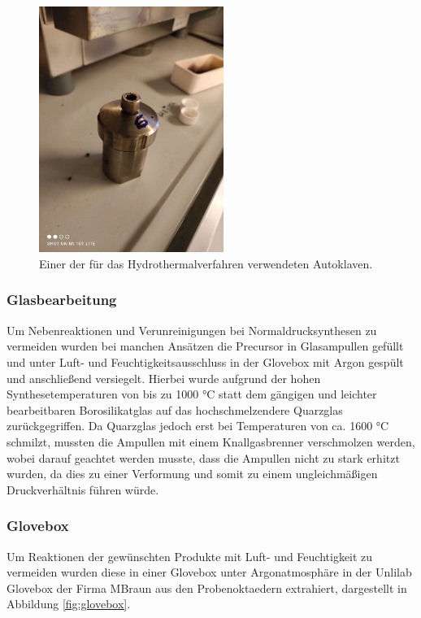 \documentclass[12pt]{article}
\begin{document}
\begin{figure}[H]
    \centering
    \includegraphics[height=8cm]{Images/Autoklave.jpeg}
    \caption{Einer der für das Hydrothermalverfahren verwendeten Autoklaven.}
    \label{fig:klavori}
\end{figure}



\subsubsection{Glasbearbeitung}
Um Nebenreaktionen und Verunreinigungen bei Normaldrucksynthesen zu vermeiden wurden bei manchen Ansätzen die Precursor in Glasampullen gefüllt und unter Luft- und Feuchtigkeitsausschluss in der Glovebox mit Argon gespült und anschließend versiegelt.
Hierbei wurde aufgrund der hohen Synthesetemperaturen von bis zu 1000 \si{\degreeCelsius} statt dem gängigen und leichter bearbeitbaren Borosilikatglas auf das hochschmelzendere Quarzglas zurückgegriffen.
Da Quarzglas jedoch erst bei Temperaturen von ca. 1600 \si{\degreeCelsius} schmilzt, mussten die Ampullen mit einem Knallgasbrenner verschmolzen werden, wobei darauf geachtet werden musste, dass die Ampullen nicht zu stark erhitzt wurden, da dies zu einer Verformung und somit zu einem ungleichmäßigen Druckverhältnis führen würde.

\subsubsection{Glovebox}
Um Reaktionen der gewünschten Produkte mit Luft- und Feuchtigkeit zu vermeiden wurden diese in einer Glovebox unter Argonatmosphäre in der Unlilab Glovebox der Firma MBraun aus den Probenoktaedern extrahiert, dargestellt in Abbildung \ref{fig:glovebox}.
\end{document}
